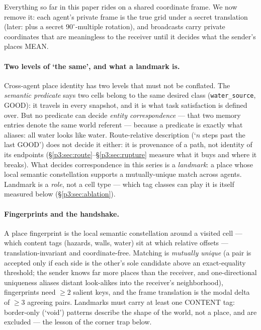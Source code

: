 \documentclass{article}
\begin{document}
Everything so far in this paper rides
on a shared coordinate frame. We now remove it: each agent's private
frame is the true grid under a secret translation (later: plus a
secret $90^\circ$-multiple rotation), and broadcasts carry private
coordinates that are meaningless to the receiver until it decides
what the sender's places MEAN.

\paragraph{Two levels of `the same', and what a landmark is.}
Cross-agent place identity has two levels that must not be conflated.
The \emph{semantic predicate} says two cells belong to the same
desired class (\texttt{water\_source}, GOOD): it travels in every
snapshot, and it is what task satisfaction is defined over. But no
predicate can decide \emph{entity correspondence} --- that two memory
entries denote the same world referent --- because a predicate is
exactly what aliases: all water looks like water. Route-relative
description (`$n$ steps past the last GOOD') does not decide it
either: it is provenance of a path, not identity of its endpoints
(\S\ref{p3:sec:route}--\S\ref{p3:sec:rupture} measure what it buys and
where it breaks). What decides correspondence in this series is a
\emph{landmark}: a place whose local semantic constellation supports
a mutually-unique match across agents. Landmark is a \emph{role}, not
a cell type --- which tag classes can play it is itself measured
below (\S\ref{p3:sec:ablation}).

\paragraph{Fingerprints and the handshake.} A place fingerprint is the
local semantic constellation around a visited cell --- which content
tags (hazards, walls, water) sit at which relative offsets ---
translation-invariant and coordinate-free. Matching is
\emph{mutually unique} (a pair is accepted only if each side is the
other's sole candidate above an exact-equality threshold; the sender
knows far more places than the receiver, and one-directional
uniqueness aliases distant look-alikes into the receiver's
neighborhood), fingerprints need $\ge 2$ salient keys, and the frame
translation is the modal delta of $\ge 3$ agreeing pairs. Landmarks
must carry at least one CONTENT tag: border-only (`void') patterns
describe the shape of the world, not a place, and are excluded ---
the lesson of the corner trap below.
\end{document}
